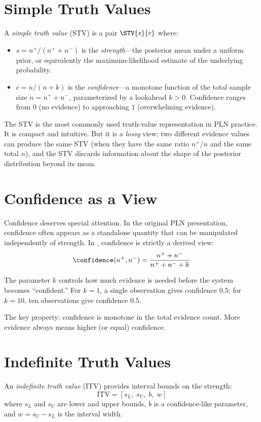 \documentclass[11pt,openany]{report}
\begin{document}
\section{Simple Truth Values}

A \emph{simple truth value} (STV) is a pair $\STV{s}{c}$ where:
\begin{itemize}
\item $s = n^+ / (n^+ + n^-)$ is the \emph{strength}---the posterior mean
  under a uniform prior, or equivalently the maximum-likelihood estimate
  of the underlying probability.
\item $c = n / (n + k)$ is the \emph{confidence}---a monotone function of
  the total sample size $n = n^+ + n^-$, parameterized by a lookahead
  $k > 0$.  Confidence ranges from $0$ (no evidence) to approaching $1$
  (overwhelming evidence).
\end{itemize}

The STV is the most commonly used truth-value representation in PLN
practice.  It is compact and intuitive.  But it is a \emph{lossy} view:
two different evidence values can produce the same STV (when they have
the same ratio $n^+/n$ and the same total $n$), and the STV discards
information about the shape of the posterior distribution beyond its
mean.

\section{Confidence as a View}

Confidence deserves special attention.  In the original PLN presentation,
confidence often appears as a standalone quantity that can be manipulated
independently of strength.  In \xiPLN{}, confidence is strictly a derived
view:
\[
  \confidence(n^+, n^-) = \frac{n^+ + n^-}{n^+ + n^- + k}
\]

The parameter $k$ controls how much evidence is needed before the system
becomes ``confident.''  For $k = 1$, a single observation gives
confidence $0.5$; for $k = 10$, ten observations give confidence
$0.5$.

The key property: confidence is monotone in the total evidence count.
More evidence always means higher (or equal) confidence.

\section{Indefinite Truth Values}

An \emph{indefinite truth value} (ITV) provides interval bounds on the
strength:
\[
  \mathrm{ITV} = [s_L,\; s_U,\; b,\; w]
\]
where $s_L$ and $s_U$ are lower and upper bounds, $b$ is a confidence-like
parameter, and $w = s_U - s_L$ is the interval width.
\end{document}
